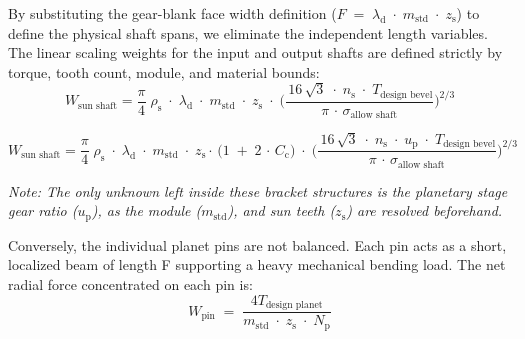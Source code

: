         By substituting the gear-blank face width definition ($F\;=\;\lambda_{\text{d}}\;\cdot\;m_{\text{std}}\;\cdot\;z_{\text{s}}$) 
        to define the physical shaft spans, we eliminate the independent length variables. The linear scaling weights 
        for the input and output shafts are defined strictly by torque, tooth count, module, and material bounds:
            \begin{equation}
                \label{eq:sunshaftmassa}
                W_{\text{sun shaft}}
                = \frac{\pi}{4}\; \rho_{\text{s}}
                \;\cdot\; \lambda_{\text{d}}
                \;\cdot\; m_{\text{std}}
                \;\cdot\; z_{\text{s}}
                \;\cdot\;
                \biggl( \frac{\,16\,\sqrt{3}\;\cdot\;n_{\text{s}}\;\cdot\;T_{\text{design bevel}}}
                {\pi\,\cdot\,\sigma_{\text{allow shaft}}}\biggr)^{2/3}
            \end{equation}

            \begin{equation}
                \label{eq:sunshaftmassb}
                W_{\text{sun shaft}}
                = \frac{\pi}{4}\; \rho_{\text{s}}
                \;\cdot\; \lambda_{\text{d}}
                \;\cdot\; m_{\text{std}}
                \;\cdot\; z_{\text{s}}
                \cdot\,\bigl(1\;+\;2\,\cdot\,C_{\text{c}}\bigr)
                \;\cdot\;
                \biggl( \frac{\,16\,\sqrt{3}\;\cdot\;n_{\text{s}}\;\cdot\;u_{\text{p}}\;\cdot\;T_{\text{design bevel}}}
                {\pi\,\cdot\,\sigma_{\text{allow shaft}}}\biggr)^{2/3}
            \end{equation}
        
        \textit{Note: The only unknown left inside these bracket structures is the planetary stage 
        gear ratio ($u_{\text{p}}$), as the module ($m_{\text{std}}$), and sun teeth ($z_{\text{s}}$) are resolved beforehand.}

        Conversely, the individual planet pins are not balanced. Each pin acts as a short, localized beam of 
        length F supporting a heavy mechanical bending load. The net radial force concentrated on each pin is:
            \begin{equation}
                \label{eq:pinmass}
                W_{\text{pin}}
                \;=\;
                \frac{4T_{\text{design planet}}}
                {m_{\text{std}}\;\cdot\;z_{\text{s}}\;\cdot\;N_{\text{p}}}
            \end{equation}
        
